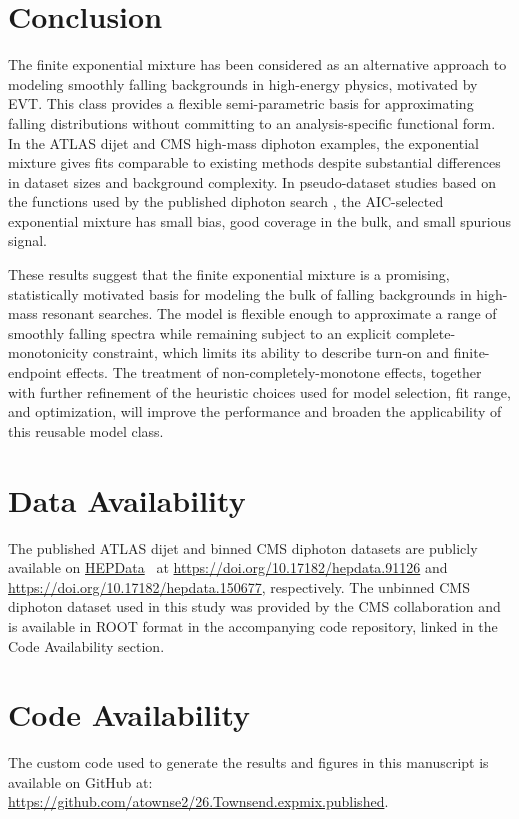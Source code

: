 \documentclass[a4paper,11pt]{article}
\begin{document}
\section{Conclusion} \label{sec:conclusion}

The finite exponential mixture has been considered as an alternative approach to modeling 
smoothly falling backgrounds in high-energy physics, motivated by EVT.
This class provides a flexible semi-parametric basis for approximating falling distributions 
without committing to an analysis-specific functional form. In the ATLAS dijet and CMS 
high-mass diphoton examples, the exponential mixture gives fits comparable to existing methods despite substantial differences in dataset sizes and background complexity.
In pseudo-dataset studies based on the functions used by the published diphoton search \cite{CMS_high_mass_diphoton}, the AIC-selected exponential mixture has small bias, good coverage in the bulk, and small spurious signal.

These results suggest that the finite exponential mixture is a promising, statistically motivated basis for modeling the bulk of falling backgrounds in high-mass resonant searches. The model is flexible enough to approximate a range of smoothly falling spectra while remaining subject to an explicit complete-monotonicity constraint, which limits its ability to describe turn-on and finite-endpoint effects. The treatment of non-completely-monotone effects, together with further refinement of the heuristic choices used for model selection, fit range, and optimization, will improve the performance and broaden the applicability of this reusable model class.

\section*{Data Availability}

The published ATLAS dijet and binned CMS diphoton datasets are publicly available on \href{https://www.hepdata.net/}{HEPData}~\cite{Maguire_2017} at \url{https://doi.org/10.17182/hepdata.91126} and \url{https://doi.org/10.17182/hepdata.150677}, respectively. The unbinned CMS diphoton dataset used in this study was provided by the CMS collaboration and is available in ROOT format in the accompanying code repository, linked in the Code Availability section.

\section*{Code Availability}
The custom code used to generate the results and figures in this manuscript is available on GitHub at: \url{https://github.com/atownse2/26.Townsend.expmix.published}.
\end{document}
